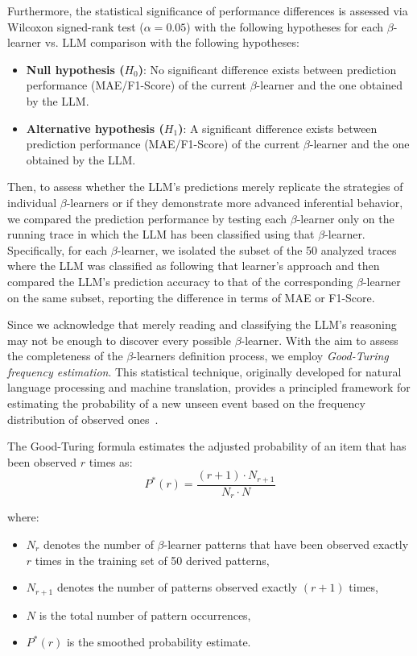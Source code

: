 \documentclass[manuscript,screen,review]{acmart}
\begin{document}
Furthermore, the statistical significance of performance differences is assessed via Wilcoxon signed-rank test ($\alpha = 0.05$) with the following hypotheses for each $\beta$-learner vs. LLM comparison with the following hypotheses:

\begin{itemize}
\item \textbf{Null hypothesis ($H_0$)}: No significant difference exists between prediction performance (MAE/F1-Score) of the current $\beta$-learner and the one obtained by the LLM.

\item \textbf{Alternative hypothesis ($H_1$)}: A significant difference exists between prediction performance (MAE/F1-Score) of the current $\beta$-learner and the one obtained by the LLM.
\end{itemize}

Then, to assess whether the LLM’s predictions merely replicate the strategies of individual $\beta$-learners or if they demonstrate more advanced inferential behavior, we compared the prediction performance by testing each $\beta$-learner only on the running trace in which the LLM has been classified using that $\beta$-learner. Specifically, for each $\beta$-learner, we isolated the subset of the 50 analyzed traces where the LLM was classified as following that learner’s approach and then compared the LLM’s prediction accuracy to that of the corresponding $\beta$-learner on the same subset, reporting the difference in terms of MAE or F1-Score. 

Since we acknowledge that merely reading and classifying the LLM's reasoning may not be enough to discover every possible $\beta$-learner. With the aim to assess the completeness of the $\beta$-learners definition process, we employ \emph{Good-Turing frequency estimation}. This statistical technique, originally developed for natural language processing and machine translation, provides a principled framework for estimating the probability of a new unseen event based on the frequency distribution of observed ones~\cite{good1953population}.

The Good-Turing formula estimates the adjusted probability of an item that has been observed $r$ times as:
\begin{equation}
P^*(r) = \frac{(r+1) \cdot N_{r+1}}{N_r \cdot N}
\label{eq:good_turing}
\end{equation}

where:
\begin{itemize}
\item $N_r$ denotes the number of $\beta$-learner patterns that have been observed exactly $r$ times in the training set of 50 derived patterns,
\item $N_{r+1}$ denotes the number of patterns observed exactly $(r+1)$ times,
\item $N$ is the total number of pattern occurrences,
\item $P^*(r)$ is the smoothed probability estimate.
\end{itemize}
\end{document}
